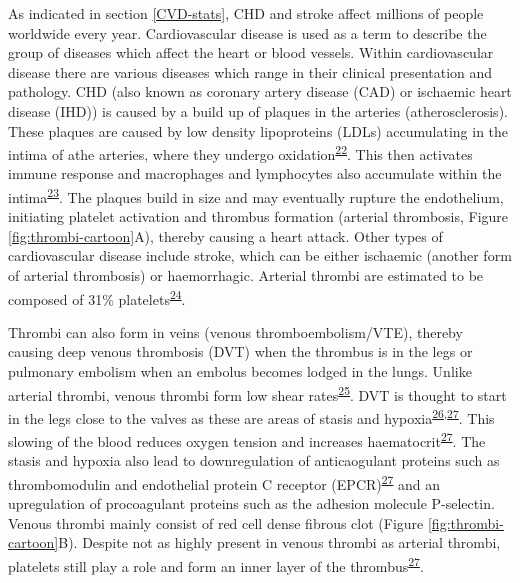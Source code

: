 \documentclass[11pt,twoside]{bristolthesis}
\begin{document}
As indicated in section \ref{CVD-stats}, CHD and stroke affect millions of people worldwide every year. Cardiovascular disease is used as a term to describe the group of diseases which affect the heart or blood vessels. Within cardiovascular disease there are various diseases which range in their clinical presentation and pathology. CHD (also known as coronary artery disease (CAD) or ischaemic heart disease (IHD)) is caused by a build up of plaques in the arteries (atherosclerosis). These plaques are caused by low density lipoproteins (LDLs) accumulating in the intima of athe arteries, where they undergo oxidation\textsuperscript{\protect\hyperlink{ref-Bentzon2014}{22}}. This then activates immune response and macrophages and lymphocytes also accumulate within the intima\textsuperscript{\protect\hyperlink{ref-Badimon2012}{23}}. The plaques build in size and may eventually rupture the endothelium, initiating platelet activation and thrombus formation (arterial thrombosis, Figure \ref{fig:thrombi-cartoon}A), thereby causing a heart attack. Other types of cardiovascular disease include stroke, which can be either ischaemic (another form of arterial thrombosis) or haemorrhagic. Arterial thrombi are estimated to be composed of 31\% platelets\textsuperscript{\protect\hyperlink{ref-Chernysh2020}{24}}.

Thrombi can also form in veins (venous thromboembolism/VTE), thereby causing deep venous thrombosis (DVT) when the thrombus is in the legs or pulmonary embolism when an embolus becomes lodged in the lungs. Unlike arterial thrombi, venous thrombi form low shear rates\textsuperscript{\protect\hyperlink{ref-Koupenova2017a}{25}}. DVT is thought to start in the legs close to the valves as these are areas of stasis and hypoxia\textsuperscript{\protect\hyperlink{ref-Esmon2009}{26},\protect\hyperlink{ref-Stone2017}{27}}. This slowing of the blood reduces oxygen tension and increases haematocrit\textsuperscript{\protect\hyperlink{ref-Stone2017}{27}}. The stasis and hypoxia also lead to downregulation of anticaogulant proteins such as thrombomodulin and endothelial protein C receptor (EPCR)\textsuperscript{\protect\hyperlink{ref-Stone2017}{27}} and an upregulation of procoagulant proteins such as the adhesion molecule P-selectin. Venous thrombi mainly consist of red cell dense fibrous clot (Figure \ref{fig:thrombi-cartoon}B). Despite not as highly present in venous thrombi as arterial thrombi, platelets still play a role and form an inner layer of the thrombus\textsuperscript{\protect\hyperlink{ref-Stone2017}{27}}.
\end{document}
